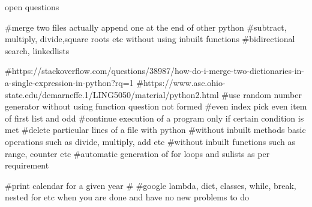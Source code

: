 open questions

#merge two files actually append one at the end of other python
#subtract, multiply, divide,square roots etc without using inbuilt functions
#bidirectional search, linkedlists

#https://stackoverflow.com/questions/38987/how-do-i-merge-two-dictionaries-in-a-single-expression-in-python?rq=1
#https://www.asc.ohio-state.edu/demarneffe.1/LING5050/material/python2.html
#use  random number generator without using function
question not formed #even index pick even item of first list and odd 
#continue execution of a program only if certain condition is met
#delete particular lines of a file with python
#without inbuilt methods basic operations such as divide, multiply, add etc
#without inbuilt functions such as range, counter etc
#automatic generation of for loops and sulists as per requirement

#print calendar for a given year 
#
#google lambda, dict, classes, while, break, nested for etc  when you are done and have no new problems to do



